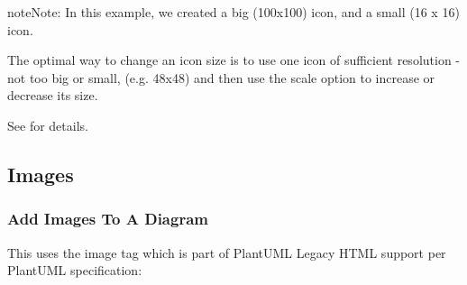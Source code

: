 \documentclass[letterpaper,10pt,english]{sphinxmanual}
\begin{document}
\begin{sphinxadmonition}{note}{Note:}
In this example, we created a big (100x100) icon, and a small (16 x 16) icon.

The optimal way to change an icon size is to use one icon of sufficient resolution - not too big or small, (e.g. 48x48) and then use the
scale option to increase or decrease its size.

See {\hyperref[\detokenize{scale/scale:scale-label}]{}} for details.
\end{sphinxadmonition}


\subsection{Images}
\label{\detokenize{PlantUMLSpriteLibraries/plantuml_sprites:images}}

\subsubsection{Add Images To A Diagram}
\label{\detokenize{PlantUMLSpriteLibraries/plantuml_sprites:add-images-to-a-diagram}}
This uses the image tag which is part of PlantUML  Legacy HTML support per PlantUML specification:
\end{document}
